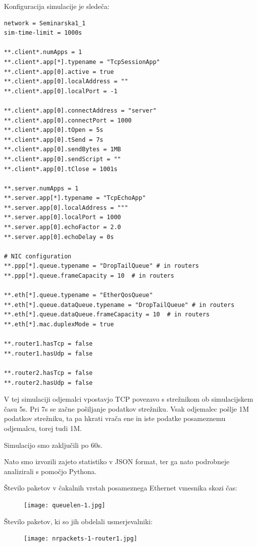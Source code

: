 \documentclass[11pt,a4paper,slovene]{myarticle}
\begin{document}
Konfiguracija simulacije je sledeča:

\begin{lstlisting}
network = Seminarska1_1
sim-time-limit = 1000s

**.client*.numApps = 1
**.client*.app[*].typename = "TcpSessionApp"
**.client*.app[0].active = true
**.client*.app[0].localAddress = ""
**.client*.app[0].localPort = -1

**.client*.app[0].connectAddress = "server"
**.client*.app[0].connectPort = 1000
**.client*.app[0].tOpen = 5s
**.client*.app[0].tSend = 7s
**.client*.app[0].sendBytes = 1MB
**.client*.app[0].sendScript = ""
**.client*.app[0].tClose = 1001s

**.server.numApps = 1
**.server.app[*].typename = "TcpEchoApp"
**.server.app[0].localAddress = """
**.server.app[0].localPort = 1000
**.server.app[0].echoFactor = 2.0
**.server.app[0].echoDelay = 0s

# NIC configuration
**.ppp[*].queue.typename = "DropTailQueue" # in routers
**.ppp[*].queue.frameCapacity = 10  # in routers

**.eth[*].queue.typename = "EtherQosQueue"
**.eth[*].queue.dataQueue.typename = "DropTailQueue" # in routers
**.eth[*].queue.dataQueue.frameCapacity = 10  # in routers
**.eth[*].mac.duplexMode = true

**.router1.hasTcp = false
**.router1.hasUdp = false

**.router2.hasTcp = false
**.router2.hasUdp = false
\end{lstlisting}

V tej simulaciji odjemalci vpostavjo TCP povezavo s strežnikom ob simulacijskem času 5s. Pri 7s se začne pošiljanje podatkov strežniku. Vsak odjemalec pošlje 1M podatkov strežniku, ta pa hkrati vrača ene in iste podatke posameznemu odjemalcu, torej tudi 1M.

Simulacijo smo zaključili po 60s.

Nato smo izvozili zajeto statistiko v JSON format, ter ga nato podrobneje analizirali s pomočjo Pythona.

Število paketov v čakalnih vrstah posameznega Ethernet vmesnika skozi čas:

\begin{figure}[h]
  \texttt{[image: queuelen-1.jpg]}
\end{figure}

Število paketov, ki so jih obdelali usmerjevalniki:

\begin{figure}[h]
  \texttt{[image: nrpackets-1-router1.jpg]}
\end{figure}
\end{document}
